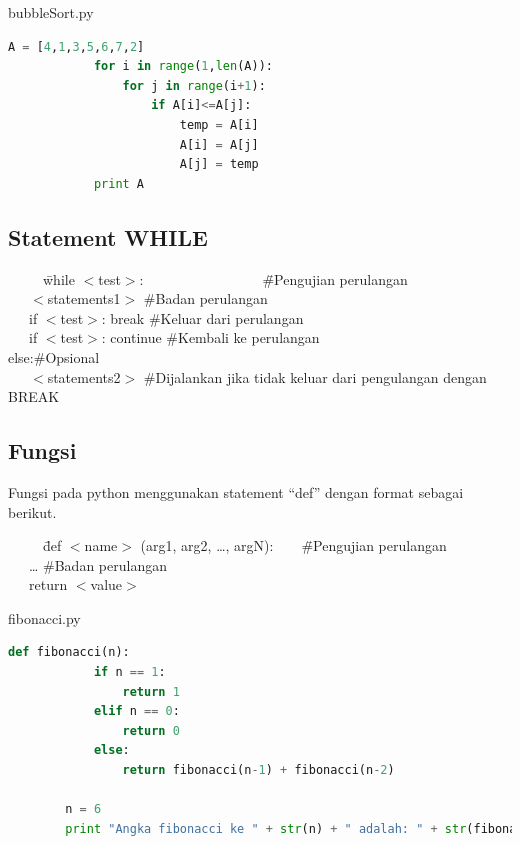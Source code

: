 \begin{IDE}
	\begin{listprog}{bubbleSort.py}
		\label{lst:tulisTeksPython}
		\begin{lstlisting}[language=Python]
			A = [4,1,3,5,6,7,2]
			for i in range(1,len(A)):
			    for j in range(i+1):
			        if A[i]<=A[j]:
			            temp = A[i]
			            A[i] = A[j]
			            A[j] = temp
			print A
		\end{lstlisting}
	\end{listprog}		
\end{IDE}

\subsection{Statement WHILE}

\begin{tabbing}
~~~~~\=while $<$test$>$:~~~~~~~~~~~~~~~~~\=\#Pengujian perulangan\\
\>~~~$<$statements1$>$ \> \#Badan perulangan\\
\>~~~if $<$test$>$: break \> \#Keluar dari perulangan\\
\>~~~if $<$test$>$: continue \> \#Kembali ke perulangan\\
\>else:\>\#Opsional\\
\>~~~$<$statements2$>$\> \#Dijalankan jika tidak keluar dari pengulangan dengan BREAK\\
\end{tabbing}

\subsection{Fungsi}

Fungsi pada python menggunakan statement ``def'' dengan format sebagai berikut.
\begin{tabbing}
~~~~~\=def $<$name$>$ (arg1, arg2, \ldots, argN):~~~~\=\#Pengujian perulangan\\
\>~~~\ldots \> \#Badan perulangan\\
\>~~~return $<$value$>$
\end{tabbing}


\begin{IDE}
	\begin{listprog}{fibonacci.py}
		\label{lst:tulisTeksPython}
		\begin{lstlisting}[language=Python]
		def fibonacci(n):
		    if n == 1:
		        return 1
		    elif n == 0:
		        return 0
		    else:
		        return fibonacci(n-1) + fibonacci(n-2)
		
		n = 6
		print "Angka fibonacci ke " + str(n) + " adalah: " + str(fibonacci(n))		
		\end{lstlisting}
	\end{listprog}
\end{IDE}

